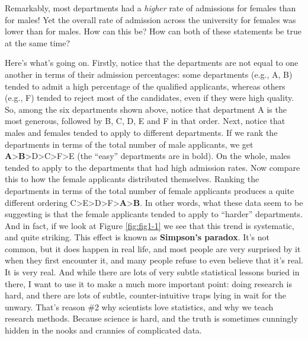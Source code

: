 \documentclass[
]{book}
\begin{document}
Remarkably, most departments had a \emph{higher} rate of admissions for females than for males! Yet the overall rate of admission across the university for females was lower than for males. How can this be? How can both of these statements be true at the same time?

Here's what's going on. Firstly, notice that the departments are not equal to one another in terms of their admission percentages: some departments (e.g., A, B) tended to admit a high percentage of the qualified applicants, whereas others (e.g., F) tended to reject most of the candidates, even if they were high quality. So, among the six departments shown above, notice that department A is the most generous, followed by B, C, D, E and F in that order. Next, notice that males and females tended to apply to different departments. If we rank the departments in terms of the total number of male applicants, we get \textbf{A}\textgreater{}\textbf{B}\textgreater D\textgreater C\textgreater F\textgreater E (the ``easy'' departments are in bold). On the whole, males tended to apply to the departments that had high admission rates. Now compare this to how the female applicants distributed themselves. Ranking the departments in terms of the total number of female applicants produces a quite different ordering C\textgreater E\textgreater D\textgreater F\textgreater{}\textbf{A}\textgreater{}\textbf{B}. In other words, what these data seem to be suggesting is that the female applicants tended to apply to ``harder'' departments. And in fact, if we look at Figure \ref{fig:fig1-1} we see that this trend is systematic, and quite striking. This effect is known as \textbf{Simpson's paradox}. It's not common, but it does happen in real life, and most people are very surprised by it when they first encounter it, and many people refuse to even believe that it's real. It is very real. And while there are lots of very subtle statistical lessons buried in there, I want to use it to make a much more important point: doing research is hard, and there are lots of subtle, counter-intuitive traps lying in wait for the unwary. That's reason \#2 why scientists love statistics, and why we teach research methods. Because science is hard, and the truth is sometimes cunningly hidden in the nooks and crannies of complicated data.
\end{document}
